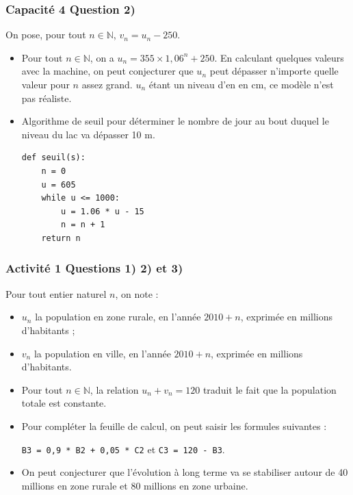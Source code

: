 \documentclass[11pt, hyperref={urlcolor=red,%
            linkcolor=blue, %
            colorlinks=true}]{beamer}
\newcommand{\N}{\mathbb{N}}
\begin{document}
\begin{frame}[fragile]
\frametitle{Capacité 4 Question 2)}

On pose, pour tout $n\in \N$, $v_n=u_n-250$.



\begin{itemize}
\pause \item  Pour tout $n\in \N$, on a $u_n=355\times 1,06^{n}+250$. En calculant quelques valeurs avec la machine, on peut conjecturer que $u_{n}$ peut dépasser n'importe quelle valeur pour $n$ assez grand. $u_{n}$ étant un niveau d'en en cm, ce modèle  n'est pas réaliste.

\pause \item Algorithme de seuil pour déterminer le nombre de jour au bout duquel le niveau du lac va dépasser 10 m.

\begin{lstlisting}[style=rond]
def seuil(s):
	n = 0
	u = 605
	while u <= 1000:
		u = 1.06 * u - 15
		n = n + 1
	return n
\end{lstlisting}






\end{itemize}

\end{frame}





\begin{frame}
\frametitle{Activité 1 Questions 1)  2) et 3)}
Pour tout entier naturel $n$, on note :


\begin{itemize}
\item $u_n$ la population en zone rurale, en l'année $2010 + n$, exprimée en millions d'habitants ;
\item $v_n$ la population en ville, en l'année $2010 + n$, exprimée en millions d'habitants.
\end{itemize}


\begin{itemize}
\pause \item  Pour tout $n\in \N$, la relation  $u_{n}+v_{n}=120$ traduit le fait que la population totale est constante.

\pause \item Pour compléter la feuille de calcul, on peut saisir les formules suivantes :

\texttt{B3 = 0,9 * B2 + 0,05 * C2} et \texttt{C3 = 120 - B3}.


\pause \item On peut conjecturer que l'évolution à long terme va se stabiliser autour de 40 millions en zone rurale et 80 millions en zone urbaine.


\end{itemize}

\end{frame}
\end{document}
